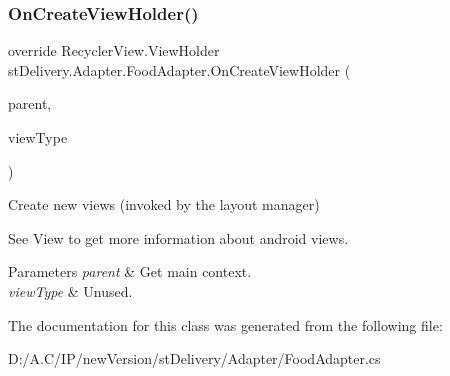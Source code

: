 \subsubsection{\texorpdfstring{On\+Create\+View\+Holder()}{OnCreateViewHolder()}}
{\footnotesize\ttfamily override Recycler\+View.\+View\+Holder st\+Delivery.\+Adapter.\+Food\+Adapter.\+On\+Create\+View\+Holder (\begin{DoxyParamCaption}\item[{View\+Group}]{parent,  }\item[{int}]{view\+Type }\end{DoxyParamCaption})}



Create new views (invoked by the layout manager) 

See View to get more information about android views. 
\begin{DoxyParams}{Parameters}
{\em parent} & Get main context.\\
\hline
{\em view\+Type} & Unused.\\
\hline
\end{DoxyParams}


The documentation for this class was generated from the following file\+:\begin{DoxyCompactItemize}
\item 
D\+:/\+A.\+C/\+I\+P/new\+Version/st\+Delivery/\+Adapter/Food\+Adapter.\+cs\end{DoxyCompactItemize}
